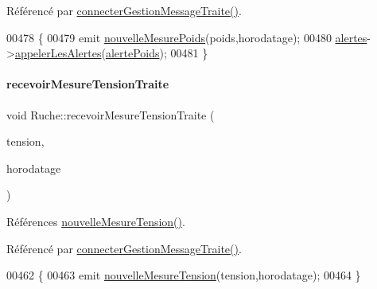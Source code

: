 Référencé par \hyperlink{class_ruche_a20ec8c6dc931218e5cf682050fe845d9}{connecter\+Gestion\+Message\+Traite()}.


\begin{DoxyCode}
00478 \{
00479     emit \hyperlink{class_ruche_abe5e5d4f4070766d5295d4dc6e0ce03c}{nouvelleMesurePoids}(poids,horodatage);
00480     \hyperlink{class_ruche_af07644ddce44cb5ed4286475dc0f9d46}{alertes}->\hyperlink{class_alertes_ad04a02dcc6e6f14da0784c7054888b05}{appelerLesAlertes}(\hyperlink{parametres_8h_a83a725fd153179a2bd97afcc8307737ba130a82230092934eb515b95603d12956}{alertePoids});
00481 \}
\end{DoxyCode}
\mbox{\label{class_ruche_a65782ea2ee63003f2eae45e2530e3d5b}} 
\paragraph{\texorpdfstring{recevoir\+Mesure\+Tension\+Traite}{recevoirMesureTensionTraite}}
{\footnotesize\ttfamily void Ruche\+::recevoir\+Mesure\+Tension\+Traite (\begin{DoxyParamCaption}\item[{double}]{tension,  }\item[{Q\+String}]{horodatage }\end{DoxyParamCaption})\hspace{0.3cm}{\ttfamily [slot]}}



Références \hyperlink{class_ruche_aa3fd352b343fcf780787aeb7e42935ef}{nouvelle\+Mesure\+Tension()}.



Référencé par \hyperlink{class_ruche_a20ec8c6dc931218e5cf682050fe845d9}{connecter\+Gestion\+Message\+Traite()}.


\begin{DoxyCode}
00462 \{
00463     emit \hyperlink{class_ruche_aa3fd352b343fcf780787aeb7e42935ef}{nouvelleMesureTension}(tension,horodatage);
00464 \}
\end{DoxyCode}
\mbox{\label{class_ruche_a3b43ce547e616ee0b14e3a0e0aa44a4d}} 
